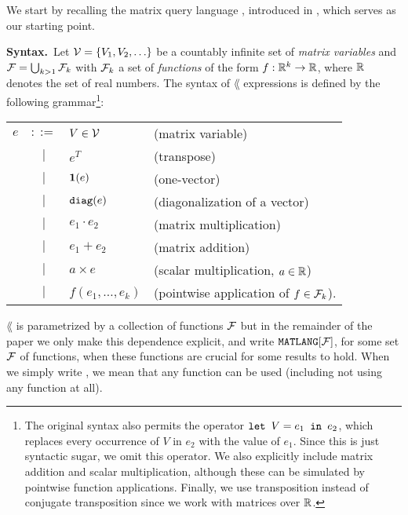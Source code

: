 
We start by recalling the matrix query language \lang, introduced in \cite{matlang,matlang-journal}, which serves as our starting point.

\smallskip
\noindent
\textbf{Syntax.}\,  Let $\mathcal{V} = \{V_1, V_2, \ldots\}$ be a countably infinite set of \textit{matrix variables} and $\mathcal{F}=\bigcup_{k>1}\mathcal{F}_k$ with
$\mathcal{F}_k$ a set of \textit{functions} of the  form $f:\mathbb{R}^k \to \mathbb{R}$, where $\mathbb{R}$ denotes the set of real numbers. The syntax of $\lang$ expressions is defined by the following grammar\footnote{The original syntax also permits the operator $\texttt{let } V = e_1 \texttt{ in } e_2$, which replaces every occurrence of $V$ in $e_2$ with the value of $e_1$. Since this is just syntactic sugar, we omit this operator. We also explicitly include matrix addition and scalar multiplication, although these can be simulated by pointwise function applications. Finally, we use transposition instead of conjugate transposition since we work with matrices over $\mathbb{R}$.}:


\begin{tabular}{lcll}
$e$ & $::=$ & $V\in \mathcal{V}$ & (matrix variable)\\
 & $|$ & $e^T$ & (transpose)\\ 
 & $|$ & $\mathbf{1}(e)$ & (one-vector)\\ 
 & $|$ & $\texttt{diag}(e)$ & (diagonalization of a vector)\\  
 & $|$ & $e_1 \cdot e_2$ & (matrix multiplication)\\   
 & $|$ & $e_1 + e_2$ & (matrix addition)\\   
 & $|$ & $a\times e$ & (scalar multiplication, $a\in\mathbb{R}$)\\   
  & $|$ & $f(e_1,\ldots ,e_k)$ & (pointwise application of $f\in\mathcal{F}_k$).    
\end{tabular}
\vspace{1ex}


$\lang$ is parametrized by a collection of functions $\mathcal{F}$ but in the remainder of the paper we only make this dependence explicit, and write $\texttt{MATLANG}[\mathcal{F}]$, for some set $\mathcal{F}$ of functions, when these functions are crucial for some results to hold. When we simply write \lang, we mean that any function can be used (including not using any function at all).

